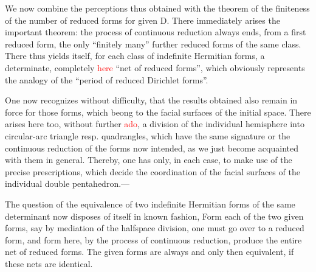 We now combine the perceptions thus obtained with the theorem of the finiteness of the number of reduced forms for given D. There immediately arises the important theorem: the process of continuous reduction always ends, from a first reduced form, the only “finitely many” further reduced forms of the same class. There thus yields itself, for each class of indefinite Hermitian forms, a determinate, completely \textcolor{red}{here} “net of reduced forms”, which obviously represents the analogy of the “period of reduced Dirichlet forms”.

One now recognizes without difficulty, that the results obtained also remain in force for those forms, which beong to the facial surfaces of the initial space. There arises here too, without further \textcolor{red}{ado}, a division of the individual hemisphere into circular-arc triangle resp. quadrangles, which have the same signature or the continuous reduction of the forms now intended, as we just become acquainted with them in general. Thereby, one has only, in each case, to make use of the precise prescriptions, which decide the coordination of the facial surfaces of the individual double pentahedron.---

The question of the equivalence of two indefinite Hermitian forms of the same determinant now disposes of itself in known fashion, Form each of the two given forms, say by mediation of the halfspace division, one must go over to a reduced form, and form here, by the process of continuous reduction, produce the entire net of reduced forms. The given forms are always and only then equivalent, if these nets are identical.

